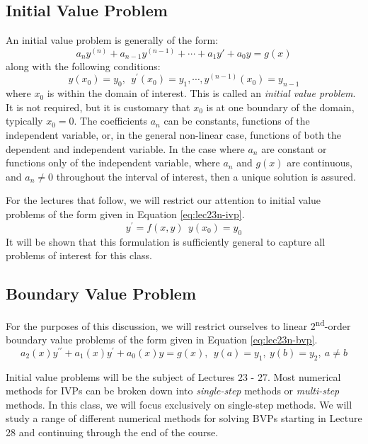 \subsection{Initial Value Problem}
An initial value problem is generally of the form:
\begin{equation*}
a_ny^{(n)}+a_{n-1}y^{(n-1)}+ \cdots + a_{1}y{\prime} + a_0y = g(x)
\end{equation*}
along with the following conditions:
\begin{equation*}
y(x_0) = y_0, \ \ y^{\prime}(x_0) = y_1, \cdots,y^{(n-1)}(x_0)=y_{n-1}
\end{equation*}
where $x_0$ is within the domain of interest.  This is called an \emph{initial value problem}.  It is not required, but it is customary that $x_0$ is at one boundary of the domain, typically $x_0=0$. The coefficients $a_n$ can be constants, functions of the independent variable, or, in the general non-linear case, functions of both the dependent and independent variable.  In the case where $a_n$ are constant or functions only of the independent variable, where $a_n$ and $g(x)$ are continuous, and $a_n \ne 0$ throughout the interval of interest, then a unique solution is assured.

For the lectures that follow, we will restrict our attention to initial value problems of the form given in Equation \ref{eq:lec23n-ivp}.
\begin{equation}
y^{\prime} = f(x,y) \ \ y(x_0) = y_0
\label{eq:lec23n-ivp}
\end{equation}
It will be shown that this formulation is sufficiently general to capture all problems of interest for this class.

\subsection{Boundary Value Problem}
For the purposes of this discussion, we will restrict ourselves to linear 2\textsuperscript{nd}-order boundary value problems of the form given in Equation \ref{eq:lec23n-bvp}.
\begin{equation}
a_2(x)y^{\prime \prime} + a_1(x)y^{\prime} + a_0(x)y = g(x), \ \ y(a) = y_1, \ y(b) = y_2, \ a \ne b
\label{eq:lec23n-bvp}
\end{equation}

Initial value problems will be the subject of Lectures 23 - 27.  Most numerical methods for IVPs can be broken down into \emph{single-step} methods or \emph{multi-step} methods.  In this class, we will focus exclusively on single-step methods.  We will study a range of different numerical methods for solving BVPs starting in Lecture 28 and continuing through the end of the course.

